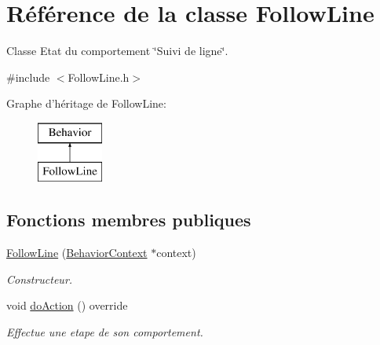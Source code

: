 \hypertarget{class_follow_line}{\section{Référence de la classe Follow\-Line}
\label{class_follow_line}
}


Classe Etat du comportement \char`\"{}\-Suivi de ligne\char`\"{}.  




{\ttfamily \#include $<$Follow\-Line.\-h$>$}

Graphe d'héritage de Follow\-Line\-:\begin{figure}[H]
\begin{center}
\leavevmode
\includegraphics[height=2.000000cm]{class_follow_line}
\end{center}
\end{figure}
\subsection*{Fonctions membres publiques}
\begin{DoxyCompactItemize}
\item 
\hypertarget{class_follow_line_a4605773b98e3407e1f4251f7525bf20b}{\hyperlink{class_follow_line_a4605773b98e3407e1f4251f7525bf20b}{Follow\-Line} (\hyperlink{class_behavior_context}{Behavior\-Context} $\ast$context)}\label{class_follow_line_a4605773b98e3407e1f4251f7525bf20b}

\begin{DoxyCompactList}\small\item\em Constructeur. \end{DoxyCompactList}\end{DoxyCompactItemize}
{\bf }\par
\begin{DoxyCompactItemize}
\item 
void \hyperlink{class_follow_line_ad85edb064ae36be3860e376c9681655d}{do\-Action} () override
\begin{DoxyCompactList}\small\item\em Effectue une etape de son comportement. \end{DoxyCompactList}\end{DoxyCompactItemize}

